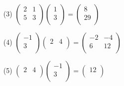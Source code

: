 \begin{example}
\begin{enumerate}
            \item[(3)] $\begin{pmatrix}
                         2 & 1 \\
                         5 & 3 \\
                    \end{pmatrix}
                    \begin{pmatrix}
                        1 \\
                        3 \\  
                    \end{pmatrix}=
                    \begin{pmatrix}
                          8 \\
                         29 \\
                    \end{pmatrix}$

            \item[(4)] $\begin{pmatrix}
                         -1 \\
                          3 \\
                    \end{pmatrix}
                    \begin{pmatrix}
                          2 & 4 \\
                    \end{pmatrix}=
                    \begin{pmatrix}
                         -2 & -4 \\
                          6 & 12 \\
                    \end{pmatrix}$

            \item[(5)] $\begin{pmatrix}
                          2 & 4 \\
                    \end{pmatrix}
                    \begin{pmatrix}
                         -1 \\
                          3 \\
                    \end{pmatrix}=
                    \begin{pmatrix}
                          12 \\
                    \end{pmatrix}$
        \end{enumerate}
\end{example} 

